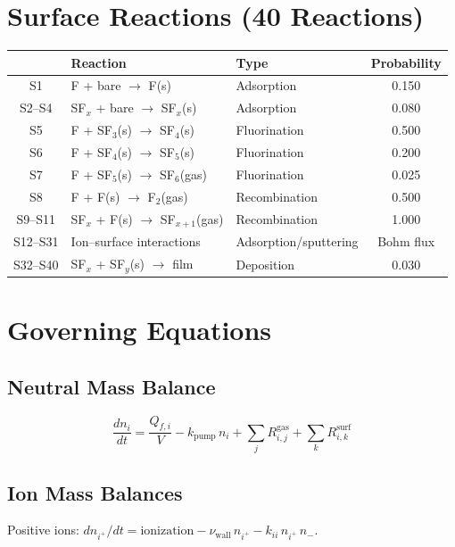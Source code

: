 \documentclass[11pt,a4paper]{article}
\begin{document}
\section{Surface Reactions (40 Reactions)}

\begin{table}[H]
\centering\small
\begin{tabular}{cllc}
\toprule
& \textbf{Reaction} & \textbf{Type} & \textbf{Probability} \\
\midrule
S1 & F + bare $\to$ F(s) & Adsorption & 0.150 \\
S2--S4 & SF$_x$ + bare $\to$ SF$_x$(s) & Adsorption & 0.080 \\
S5 & F + SF$_3$(s) $\to$ SF$_4$(s) & Fluorination & 0.500 \\
S6 & F + SF$_4$(s) $\to$ SF$_5$(s) & Fluorination & 0.200 \\
S7 & F + SF$_5$(s) $\to$ SF$_6$(gas) & Fluorination & 0.025 \\
S8 & F + F(s) $\to$ F$_2$(gas) & Recombination & 0.500 \\
S9--S11 & SF$_x$ + F(s) $\to$ SF$_{x+1}$(gas) & Recombination & 1.000 \\
S12--S31 & Ion--surface interactions & Adsorption/sputtering & Bohm flux \\
S32--S40 & SF$_x$ + SF$_y$(s) $\to$ film & Deposition & 0.030 \\
\bottomrule
\end{tabular}
\end{table}

\section{Governing Equations}

\subsection{Neutral Mass Balance}
\begin{equation}
\boxed{\frac{dn_i}{dt} = \frac{Q_{f,i}}{V} - k_\text{pump}\,n_i + \sum_j R^\text{gas}_{i,j} + \sum_k R^\text{surf}_{i,k}}
\end{equation}

\subsection{Ion Mass Balances}
Positive ions: $dn_{i^+}/dt = \text{ionization} - \nu_\text{wall}\,n_{i^+} - k_{ii}\,n_{i^+}\,n_-$.
\end{document}
